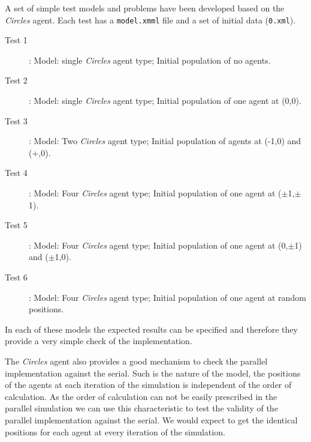 A set of simple test models and problems have been developed based on the \textsl{Circles} agent. Each test has a \texttt{model.xmml} file and a set of initial data (\texttt{0.xml}).
\begin{description}
 \item [Test 1]: Model: single \textsl{Circles} agent type; Initial population of no agents.
 \item [Test 2]: Model: single \textsl{Circles} agent type; Initial population of one agent at (0,0).
	\item [Test 3]: Model: Two \textsl{Circles} agent type; Initial population of agents at (-1,0) and (+,0).
	\item [Test 4]: Model: Four \textsl{Circles} agent type; Initial population of one agent at ($\pm$1,$\pm$1).
	\item [Test 5]: Model: Four \textsl{Circles} agent type; Initial population of one agent at (0,$\pm$1) and ($\pm$1,0).
	\item [Test 6]: Model: Four \textsl{Circles} agent type; Initial population of one agent at random positions.
	\end{description}
In each of these models the expected results can be specified and therefore they provide a very simple check of the implementation.

The \textsl{Circles} agent also provides a good mechanism to check the parallel implementation against the serial. Such is the nature of the model, the positions of the agents at each iteration of the simulation is independent of the order of calculation. As the order of calculation can not be easily prescribed in the parallel simulation we can use this characteristic to test the validity of the parallel implementation against the serial. We would expect to get the identical positions for each agent at every iteration of the simulation.


